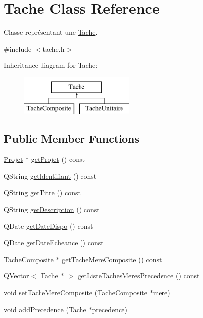 \hypertarget{class_tache}{}\section{Tache Class Reference}
\label{class_tache}


Classe représentant une \hyperlink{class_tache}{Tache}.  




{\ttfamily \#include $<$tache.\+h$>$}

Inheritance diagram for Tache\+:\begin{figure}[H]
\begin{center}
\leavevmode
\includegraphics[height=2.000000cm]{class_tache}
\end{center}
\end{figure}
\subsection*{Public Member Functions}
\begin{DoxyCompactItemize}
\item 
\hyperlink{class_projet}{Projet} $\ast$ \hyperlink{class_tache_aa6d1abc3712b5a8b571bb3c131129ac7}{get\+Projet} () const 
\item 
Q\+String \hyperlink{class_tache_aff63994ef1fe1b96cf14540f954e45c0}{get\+Identifiant} () const 
\item 
Q\+String \hyperlink{class_tache_ab9e56c6eaaa23d2c66148ff5a89724e6}{get\+Titre} () const 
\item 
Q\+String \hyperlink{class_tache_a02954f46ea1310fb0d5ceceeb94298cc}{get\+Description} () const 
\item 
Q\+Date \hyperlink{class_tache_a5f7e485d64f7e72042e1f0ad5f378df4}{get\+Date\+Dispo} () const 
\item 
Q\+Date \hyperlink{class_tache_ad44bf074be085367c3a58b81be680d70}{get\+Date\+Echeance} () const 
\item 
\hyperlink{class_tache_composite}{Tache\+Composite} $\ast$ \hyperlink{class_tache_a5d8c5f16db0287ed0539c9206f244e02}{get\+Tache\+Mere\+Composite} () const 
\item 
Q\+Vector$<$ \hyperlink{class_tache}{Tache} $\ast$ $>$ \hyperlink{class_tache_afa1e10f04b303908477feee22241820f}{get\+Liste\+Taches\+Meres\+Precedence} () const 
\item 
void \hyperlink{class_tache_ad5ed4f92ccbc0895813908c750d918a2}{set\+Tache\+Mere\+Composite} (\hyperlink{class_tache_composite}{Tache\+Composite} $\ast$mere)
\item 
void \hyperlink{class_tache_a10659477f457bc4ceafbee41b155eb66}{add\+Precedence} (\hyperlink{class_tache}{Tache} $\ast$precedence)
\end{DoxyCompactItemize}
